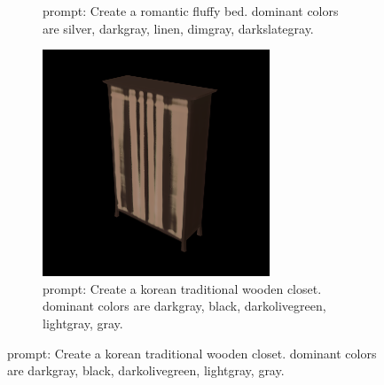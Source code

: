 \documentclass[11pt]{article}
\begin{document}
\begin{figure}[htbp]
\begin{subfigure}[t]{0.3\textwidth}
        \caption{prompt: Create a romantic fluffy bed. dominant colors are silver, darkgray, linen, dimgray, darkslategray.}
        \label{fig:romantic_furniture}
    \end{subfigure}
    \hfill
    \begin{subfigure}[t]{0.3\textwidth}
        \centering
        \includegraphics[width=\textwidth]{figures/korean_furniture.png}
        \caption{prompt: Create a korean traditional wooden closet. dominant colors are darkgray, black, darkolivegreen, lightgray, gray.}
        \label{fig:traditional_korean_furniture}
    \end{subfigure}

    \vspace{1em}


\end{figure}
\end{document}
